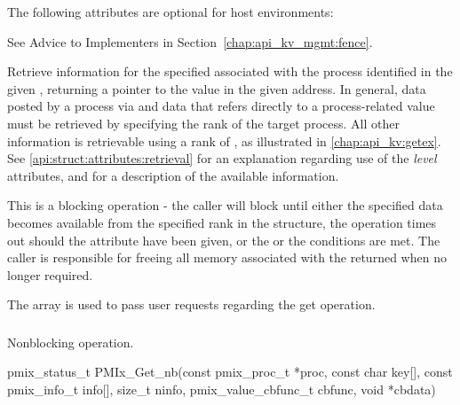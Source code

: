 \optattrstart
The following attributes are optional for host environments:

See Advice to Implementers in Section~\ref{chap:api_kv_mgmt:fence}.
\pastePRIAttributeItemEnd

\optattrend

\descr


Retrieve information for the specified  associated with the process identified in the given , returning a pointer to the value in the given address. In general, data posted by a process via  and data that refers directly to a process-related value must be retrieved by specifying the rank of the target process. All other information is retrievable using a rank of , as illustrated in \ref{chap:api_kv:getex}. See \ref{api:struct:attributes:retrieval} for an explanation regarding use of the \emph{level} attributes, and  for a description of the available information.

This is a blocking operation - the caller will block until either the specified data becomes available from the specified rank in the  structure, the operation times out should the  attribute have been given, or the  or the  conditions are met. The caller is responsible for freeing all memory associated with the returned  when no longer required.

The  array is used to pass user requests regarding the get operation.


\subsubsection{}

\summary

Nonblocking  operation.

\format

\cspecificstart
\begin{codepar}
pmix_status_t
PMIx_Get_nb(const pmix_proc_t *proc, const char key[],
            const pmix_info_t info[], size_t ninfo,
            pmix_value_cbfunc_t cbfunc, void *cbdata)
\end{codepar}
\cspecificend

